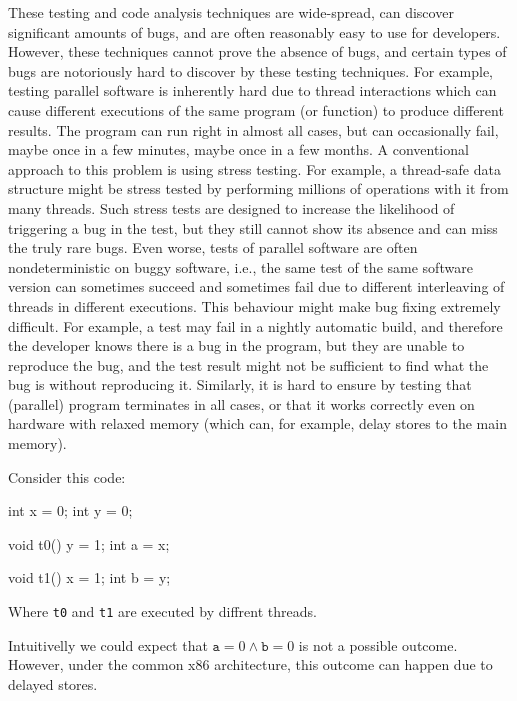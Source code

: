 These testing and code analysis techniques are wide-spread, can discover significant amounts of bugs, and are often reasonably easy to use for developers.
However, these techniques cannot prove the absence of bugs, and certain types of bugs are notoriously hard to discover by these testing techniques.
For example, testing parallel software is inherently hard due to thread interactions which can cause different executions of the same program (or function) to produce different results.
The program can run right in almost all cases, but can occasionally fail, maybe once in a few minutes, maybe once in a few months.
A conventional approach to this problem is using stress testing.
For example, a thread-safe data structure might be stress tested by performing millions of operations with it from many threads.
Such stress tests are designed to increase the likelihood of triggering a bug in the test, but they still cannot show its absence and can miss the truly rare bugs.
Even worse, tests of parallel software are often nondeterministic on buggy software, i.e., the same test of the same software version can sometimes succeed and sometimes fail due to different interleaving of threads in different executions.
This behaviour might make bug fixing extremely difficult.
For example, a test may fail in a nightly automatic build, and therefore the developer knows there is a bug in the program, but they are unable to reproduce the bug, and the test result might not be sufficient to find what the bug is without reproducing it.
Similarly, it is hard to ensure by testing that (parallel) program terminates in all cases, or that it works correctly even on hardware with relaxed memory (which can, for example, delay stores to the main memory).\begin{marginnote}%
Consider this code:

\medskip
\begin{cppcode}
int x = 0;
int y = 0;

void t0() {
  y = 1;
  int a = x;
}

void t1() {
  x = 1;
  int b = y;
}
\end{cppcode}

Where \texttt{t0} and \texttt{t1} are executed by diffrent threads.

Intuitivelly we could expect that $\texttt{a} = 0 \land \texttt{b} = 0$ is not a possible outcome.
However, under the common x86 architecture, this outcome can happen due to delayed stores.
\end{marginnote}


